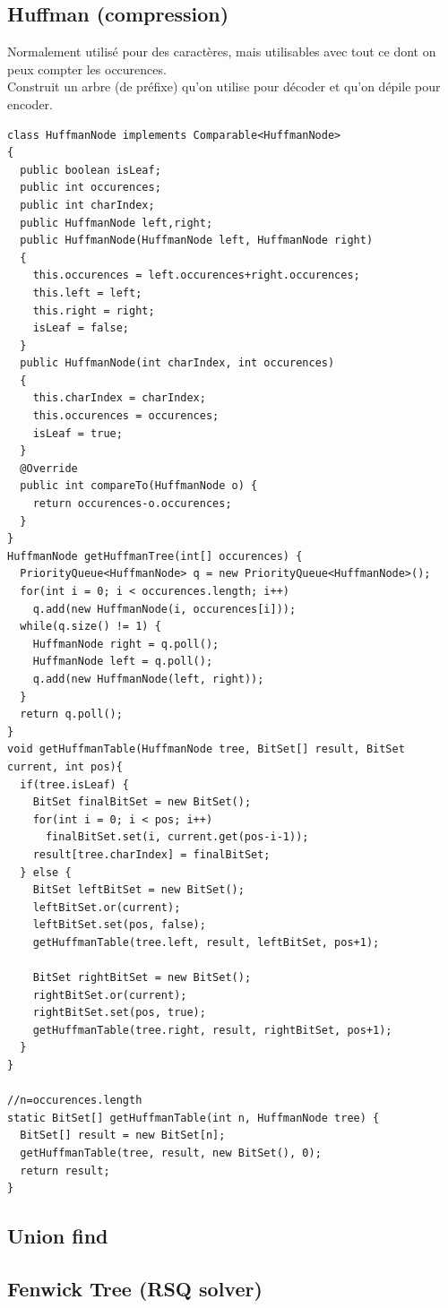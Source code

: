 \subsection{Huffman (compression)}
Normalement utilisé pour des caractères, mais utilisables avec tout ce dont on peux compter les occurences.\\
Construit un arbre (de préfixe) qu'on utilise pour décoder et qu'on dépile pour encoder.
\begin{lstlisting}
class HuffmanNode implements Comparable<HuffmanNode>
{
  public boolean isLeaf;
  public int occurences;
  public int charIndex;
  public HuffmanNode left,right;
  public HuffmanNode(HuffmanNode left, HuffmanNode right)
  {
    this.occurences = left.occurences+right.occurences;
    this.left = left;
    this.right = right;
    isLeaf = false;
  } 
  public HuffmanNode(int charIndex, int occurences)
  {
    this.charIndex = charIndex;
    this.occurences = occurences;
    isLeaf = true;
  }
  @Override
  public int compareTo(HuffmanNode o) {
    return occurences-o.occurences;
  }
}
HuffmanNode getHuffmanTree(int[] occurences) {
  PriorityQueue<HuffmanNode> q = new PriorityQueue<HuffmanNode>();
  for(int i = 0; i < occurences.length; i++)
    q.add(new HuffmanNode(i, occurences[i]));
  while(q.size() != 1) {
    HuffmanNode right = q.poll();
    HuffmanNode left = q.poll();
    q.add(new HuffmanNode(left, right));
  }
  return q.poll();
}
void getHuffmanTable(HuffmanNode tree, BitSet[] result, BitSet current, int pos){
  if(tree.isLeaf) {
    BitSet finalBitSet = new BitSet();
    for(int i = 0; i < pos; i++)
      finalBitSet.set(i, current.get(pos-i-1));
    result[tree.charIndex] = finalBitSet;
  } else {
    BitSet leftBitSet = new BitSet();
    leftBitSet.or(current);
    leftBitSet.set(pos, false);
    getHuffmanTable(tree.left, result, leftBitSet, pos+1);
            
    BitSet rightBitSet = new BitSet();
    rightBitSet.or(current);
    rightBitSet.set(pos, true);
    getHuffmanTable(tree.right, result, rightBitSet, pos+1);
  }
}
    
//n=occurences.length
static BitSet[] getHuffmanTable(int n, HuffmanNode tree) {
  BitSet[] result = new BitSet[n];
  getHuffmanTable(tree, result, new BitSet(), 0);
  return result;
}
\end{lstlisting}
\subsection{Union find}

\subsection{Fenwick Tree (RSQ solver)}

